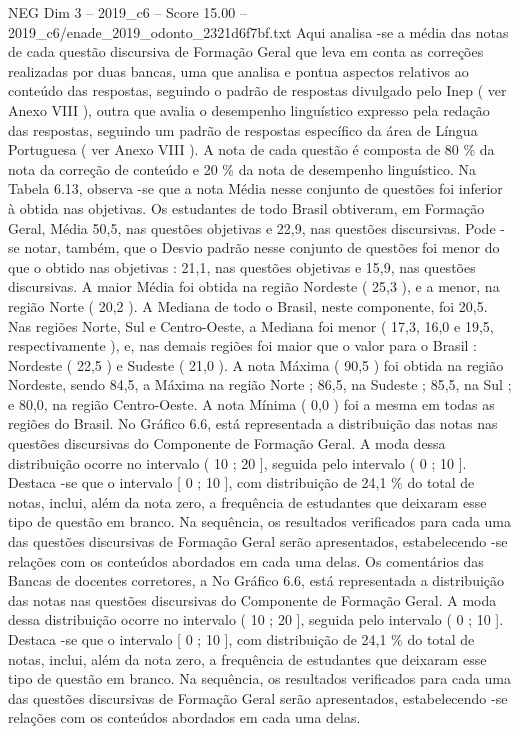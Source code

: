 \begin{textsample}{NEG Dim 3 – 2019\_c6 – Score 15.00 – 2019\_c6/enade\_2019\_odonto\_2321d6f7bf.txt}
Aqui analisa -se a média das notas de cada questão discursiva de Formação Geral que leva em conta as correções realizadas por duas bancas, uma que analisa e pontua aspectos relativos ao conteúdo das respostas, seguindo o padrão de respostas divulgado pelo Inep ( ver Anexo VIII ), outra que avalia o desempenho linguístico expresso pela redação das respostas, seguindo um padrão de respostas específico da área de Língua Portuguesa ( ver Anexo VIII ).
A nota de cada questão é composta de 80 \% da nota da correção de conteúdo e 20 \% da nota de desempenho linguístico.
Na Tabela 6.13, observa -se que a nota Média nesse conjunto de questões foi inferior à obtida nas objetivas.
Os estudantes de todo Brasil obtiveram, em Formação Geral, Média 50,5, nas questões objetivas e 22,9, nas questões discursivas.
Pode -se notar, também, que o Desvio padrão nesse conjunto de questões foi menor do que o obtido nas objetivas : 21,1, nas questões objetivas e 15,9, nas questões discursivas.
A maior Média foi obtida na região Nordeste ( 25,3 ), e a menor, na região Norte ( 20,2 ).
A Mediana de todo o Brasil, neste componente, foi 20,5.
Nas regiões Norte, Sul e Centro-Oeste, a Mediana foi menor ( 17,3, 16,0 e 19,5, respectivamente ), e, nas demais regiões foi maior que o valor para o Brasil : Nordeste ( 22,5 ) e Sudeste ( 21,0 ).
A nota Máxima ( 90,5 ) foi obtida na região Nordeste, sendo 84,5, a Máxima na região Norte ; 86,5, na Sudeste ; 85,5, na Sul ; e 80,0, na região Centro-Oeste.
A nota Mínima ( 0,0 ) foi a mesma em todas as regiões do Brasil.
No Gráfico 6.6, está representada a distribuição das notas nas questões discursivas do Componente de Formação Geral.
A moda dessa distribuição ocorre no intervalo ( 10 ; 20 ], seguida pelo intervalo ( 0 ; 10 ].
Destaca -se que o intervalo [ 0 ; 10 ], com distribuição de 24,1 \% do total de notas, inclui, além da nota zero, a frequência de estudantes que deixaram esse tipo de questão em branco.
Na sequência, os resultados verificados para cada uma das questões discursivas de Formação Geral serão apresentados, estabelecendo -se relações com os conteúdos abordados em cada uma delas.
Os comentários das Bancas de docentes corretores, a No Gráfico 6.6, está representada a distribuição das notas nas questões discursivas do Componente de Formação Geral.
A moda dessa distribuição ocorre no intervalo ( 10 ; 20 ], seguida pelo intervalo ( 0 ; 10 ].
Destaca -se que o intervalo [ 0 ; 10 ], com distribuição de 24,1 \% do total de notas, inclui, além da nota zero, a frequência de estudantes que deixaram esse tipo de questão em branco.
Na sequência, os resultados verificados para cada uma das questões discursivas de Formação Geral serão apresentados, estabelecendo -se relações com os conteúdos abordados em cada uma delas.

\end{textsample}

